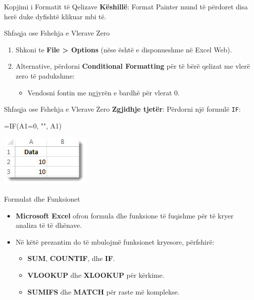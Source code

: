 \documentclass[
  ignorenonframetext,
]{beamer}
\newenvironment{Shaded}{\begin{snugshade}}{\end{snugshade}}
\newcommand{\NormalTok}[1]{#1}
\providecommand{\tightlist}{%
  \setlength{\itemsep}{0pt}\setlength{\parskip}{0pt}}
\begin{document}
\begin{frame}{Kopjimi i Formatit të Qelizave}
\label{kopjimi-i-formatit-tuxeb-qelizave-1}
\textbf{Këshillë}: Format Painter mund të përdoret disa herë duke
dyfishtë klikuar mbi të.
\end{frame}

\begin{frame}{Shfaqja ose Fshehja e Vlerave Zero}
\label{shfaqja-ose-fshehja-e-vlerave-zero}
\begin{enumerate}
\item
  Shkoni te \textbf{File \textgreater{} Options} (nëse është e
  disponueshme në Excel Web).
\item
  Alternative, përdorni \textbf{Conditional Formatting} për të bërë
  qelizat me vlerë zero të padukshme:

  \begin{itemize}
  \tightlist
  \item
    Vendosni fontin me ngjyrën e bardhë për vlerat 0.
  \end{itemize}
\end{enumerate}
\end{frame}

\begin{frame}[fragile]{Shfaqja ose Fshehja e Vlerave Zero}
\label{shfaqja-ose-fshehja-e-vlerave-zero-1}
\textbf{Zgjidhje tjetër}: Përdorni një formulë \texttt{IF}:

\begin{Shaded}
\begin{Highlighting}[]
\NormalTok{   =IF(A1=0, "", A1)}
\end{Highlighting}
\end{Shaded}

\includegraphics{./images/excel13.jpg}
\end{frame}

\begin{frame}{Formulat dhe Funksionet}
\label{formulat-dhe-funksionet}
\begin{itemize}
\item
  \textbf{Microsoft Excel} ofron formula dhe funksione të fuqishme për
  të kryer analiza të të dhënave.
\item
  Në këtë prezantim do të mbulojmë funksionet kryesore, përfshirë:

  \begin{itemize}
  \item
    \textbf{SUM}, \textbf{COUNTIF}, dhe \textbf{IF}.
  \item
    \textbf{VLOOKUP} dhe \textbf{XLOOKUP} për kërkime.
  \item
    \textbf{SUMIFS} dhe \textbf{MATCH} për raste më komplekse.
  \end{itemize}
\end{itemize}
\end{frame}
\end{document}
